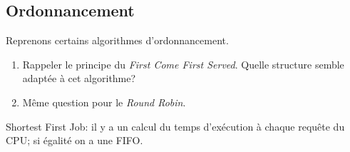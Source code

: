 \documentclass[a4paper,11pt]{article}
\begin{document}
\begin{Form}
\section{Ordonnancement}
Reprenons certains algorithmes d'ordonnancement.
\begin{activite}
\begin{enumerate}
\item Rappeler le principe du \emph{First Come First Served}. Quelle structure semble adaptée à cet algorithme?
\item Même question pour le \emph{Round Robin}.
\end{enumerate}
\end{activite}
\begin{commentprof}
Shortest First Job: il y a un calcul du temps d'exécution à chaque requête du CPU; si égalité on a une FIFO.
\end{commentprof}
\end{Form}
\end{document}
